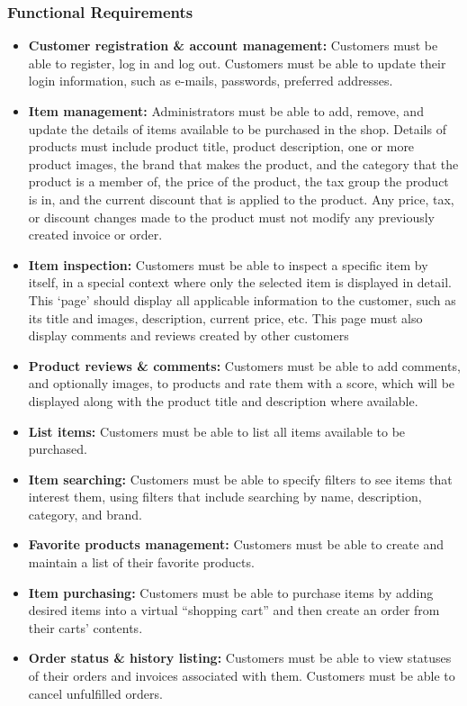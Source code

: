 \documentclass[a4paper,journal]{IEEEtran}
\begin{document}
\subsubsection{Functional Requirements}
\begin{itemize}
  \item \textbf{Customer registration \& account management:}
    Customers must be able to register, log in and log out. Customers
    must be able to update their login information, such as e-mails, passwords,
    preferred addresses.
  \item \textbf{Item management:} Administrators must be
    able to add, remove, and update the details of items available to be
    purchased in the shop. Details of products must include product title,
    product description, one or more product images, the brand that makes the
    product, and the category that the product is a member of, the price of the
    product, the tax
    group the product is in, and the current discount that is applied to the
    product. Any price, tax, or discount changes made to the product must not
    modify any previously created invoice or order.
  \item \textbf{Item inspection:} Customers must be able
    to inspect a specific item by itself, in a special context where only the
    selected item is displayed in detail. This ‘page’ should display all applicable
    information to the customer, such as its title and images, description, current
    price, etc. This page must also display comments and reviews created by other
    customers
  \item \textbf{Product reviews \& comments:} Customers
    must be able to add comments, and optionally images, to products and rate them
    with a score, which will be displayed along with the product title and
    description where available.
  \item \textbf{List items:} Customers must be able to
   list all items available to be purchased.
  \item \textbf{Item searching:} Customers must be able to
    specify filters to see items that interest them, using filters that include
    searching by name, description, category, and brand.
  \item \textbf{Favorite products management:} Customers
   must be able to create and maintain a list of their favorite products.
  \item \textbf{Item purchasing:} Customers must be able
    to purchase items by adding desired items into a virtual ``shopping cart''
    and then create an order from their carts' contents.
  \item \textbf{Order status \& history listing:}
    Customers must be able to view statuses of
    their orders and invoices associated with them. Customers must be able to
    cancel unfulfilled orders.
\end{itemize}
\end{document}
